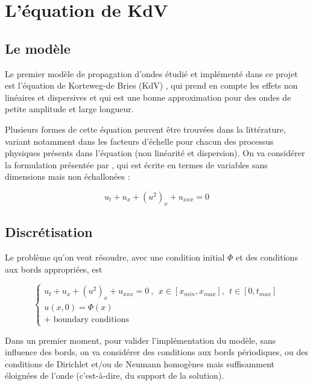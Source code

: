 \section{L'équation de KdV}
\label{sec:KdV}

\subsection{Le modèle}

\indent Le premier modèle de propagation d'ondes étudié et implémenté dans ce projet est l'équation de Korteweg-de Bries (KdV) , qui prend en compte les effets non linéaires et dispersives et qui est une bonne approximation pour des ondes de petite amplitude et large longueur. \cite{BBM1971}

 \indent Plusieurs formes de cette équation peuvent être trouvées dans la littérature, variant notamment dans les facteurs d'échelle pour chacun des processus physiques présents dans l'équation (non linéarité et dispersion). On va considérer la formulation présentée par \cite{BBM1971}, qui est écrite en termes de variables sans dimensions mais non échallonées : 

\begin{equation*}
    u_t + u_x + (u^2)_x + u_{xxx} = 0
\end{equation*}

\subsection{Discrétisation}

\indent Le problème qu'on veut résoudre, avec une condition initial $\Phi$ et des conditions aux bords appropriées, est

\begin{equation*}
\begin{cases}
    u_t + u_x + (u^2)_x + u_{xxx} = 0 \ , \ \ x \in [x_{min},x_{max}], \ \ t \in [0, t_{max}] \\
    u(x,0) = \Phi(x) \\
    \text{+ boundary conditions}
\end{cases}
\end{equation*}

\indent Dans un premier moment, pour valider l'implémentation du modèle, sans influence des bords, on va considérer des conditions aux bords périodiques, ou des conditions de Dirichlet et/ou de Neumann homogènes mais suffisamment éloignées de l'onde (c'est-à-dire, du support de la solution).

